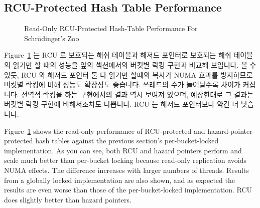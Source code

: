 \subsection{RCU-Protected Hash Table Performance}
\label{sec:datastruct:RCU-Protected Hash Table Performance}

\begin{figure}[tb]
\centering
{}
\caption{Read-Only RCU-Protected Hash-Table Performance For Schr\"odinger's Zoo}
\label{fig:datastruct:Read-Only RCU-Protected Hash-Table Performance For Schroedinger's Zoo}
\end{figure}

Figure~\ref{fig:datastruct:Read-Only RCU-Protected Hash-Table Performance For Schroedinger's Zoo}
는 RCU 로 보호되는 해쉬 테이블과 해저드 포인터로 보호되는 해쉬 테이블의 읽기만
할 때의 성능을 앞의 섹션에서의 버킷별 락킹 구현과 비교해 보입니다.
볼 수 있듯, RCU 와 해저드 포인터 둘 다 읽기만 할때의 복사가 NUMA 효과를
방지하므로 버킷별 락킹에 비해 성능도 확장성도 좋습니다.
쓰레드의 수가 늘어날수록 차이가 커집니다.
전역적 락킹을 하는 구현에서의 결과 역시 보여져 있으며, 예상한대로 그 결과는
버킷별 락킹 구현에 비해서조차도 나쁩니다.
RCU 는 해저드 포인터보다 약간 더 낫습니다.

\iffalse

Figure~\ref{fig:datastruct:Read-Only RCU-Protected Hash-Table Performance For Schroedinger's Zoo}
shows the read-only performance of RCU-protected and hazard-pointer-protected
hash tables against the previous section's per-bucket-locked implementation.
As you can see, both RCU and hazard pointers perform and scale
much better than per-bucket locking because read-only
replication avoids NUMA effects.
The difference increases with larger numbers of threads.
Results from a globally locked implementation are also shown, and as expected
the results are even worse than those of the per-bucket-locked implementation.
RCU does slightly better than hazard pointers.

